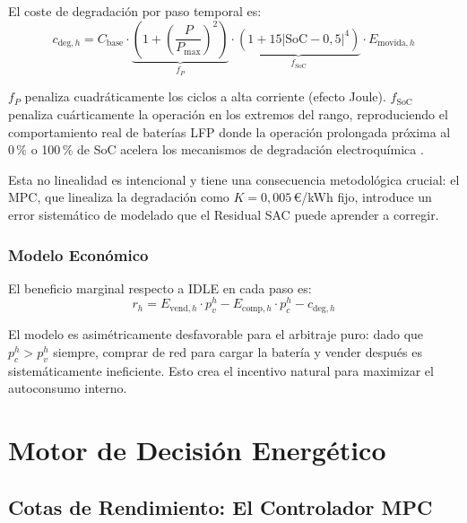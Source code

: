 \documentclass[12pt, a4paper, twoside]{report}
\begin{document}
El coste de degradación por paso temporal es:
\begin{equation}
  c_{\text{deg},h} = C_{\text{base}} \cdot
  \underbrace{\left(1 + \left(\frac{P}{P_{\max}}\right)^2\right)}_{f_P} \cdot
  \underbrace{\left(1 + 15\left|\text{SoC}-0{,}5\right|^4\right)}_{f_{\text{SoC}}} \cdot
  E_{\text{movida},h}
  \label{eq:degradacion}
\end{equation}

$f_P$ penaliza cuadráticamente los ciclos a alta corriente (efecto Joule).
$f_{\text{SoC}}$ penaliza cuárticamente la operación en los extremos del rango,
reproduciendo el comportamiento real de baterías LFP donde la operación
prolongada próxima al 0\,\% o 100\,\% de SoC acelera los mecanismos de
degradación electroquímica \citep{Xu2016}.

Esta no linealidad es intencional y tiene una consecuencia metodológica crucial:
el MPC, que linealiza la degradación como $K = 0{,}005$\,€/kWh fijo, introduce
un error sistemático de modelado que el Residual SAC puede aprender a corregir.

\subsection{Modelo Económico}

El beneficio marginal respecto a IDLE en cada paso es:
\begin{equation}
  r_h = E_{\text{vend},h} \cdot p_v^h - E_{\text{comp},h} \cdot p_c^h
        - c_{\text{deg},h}
  \label{eq:beneficio}
\end{equation}

El modelo es asimétricamente desfavorable para el arbitraje puro: dado que
$p_c^h > p_v^h$ siempre, comprar de red para cargar la batería y vender
después es sistemáticamente ineficiente. Esto crea el incentivo natural para
maximizar el autoconsumo interno.

\chapter{Motor de Decisión Energético}
\label{chap:motor}

\section{Cotas de Rendimiento: El Controlador MPC}
\label{sec:mpc}
\end{document}
